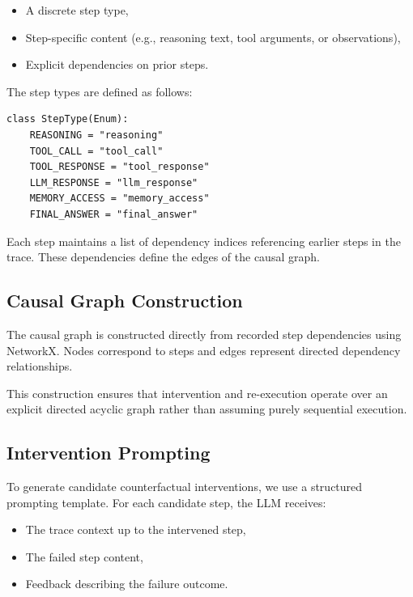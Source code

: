\documentclass{article}
\theoremstyle{plain}
\theoremstyle{definition}
\theoremstyle{remark}
\begin{document}
\begin{itemize}
    \item A discrete step type,
    \item Step-specific content (e.g., reasoning text, tool arguments, or observations),
    \item Explicit dependencies on prior steps.
\end{itemize}

The step types are defined as follows:

\begin{Verbatim}[fontsize=\footnotesize, breaklines=true, breakanywhere=true]
class StepType(Enum):
    REASONING = "reasoning"
    TOOL_CALL = "tool_call"
    TOOL_RESPONSE = "tool_response"
    LLM_RESPONSE = "llm_response"
    MEMORY_ACCESS = "memory_access"
    FINAL_ANSWER = "final_answer"
\end{Verbatim}

Each step maintains a list of dependency indices referencing earlier steps in the trace. These dependencies define the edges of the causal graph.

\subsection{Causal Graph Construction}

The causal graph is constructed directly from recorded step dependencies using NetworkX. Nodes correspond to steps and edges represent directed dependency relationships.


This construction ensures that intervention and re-execution operate over an explicit directed acyclic graph rather than assuming purely sequential execution.

\subsection{Intervention Prompting}

To generate candidate counterfactual interventions, we use a structured prompting template. For each candidate step, the LLM receives:

\begin{itemize}
    \item The trace context up to the intervened step,
    \item The failed step content,
    \item Feedback describing the failure outcome.
\end{itemize}
\end{document}
